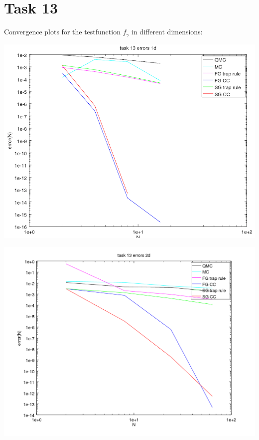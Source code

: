 \documentclass[10pt,a4paper]{article}
\begin{document}
\section*{Task 13}

Convergence plots for the testfunction $f_\gamma$ in different dimensions:
\begin{center}
\includegraphics[scale=0.5]{task_13_d1.png}
\end{center}
\begin{center}
\includegraphics[scale=0.5]{task_13_d2.png}
\end{center}
\end{document}
